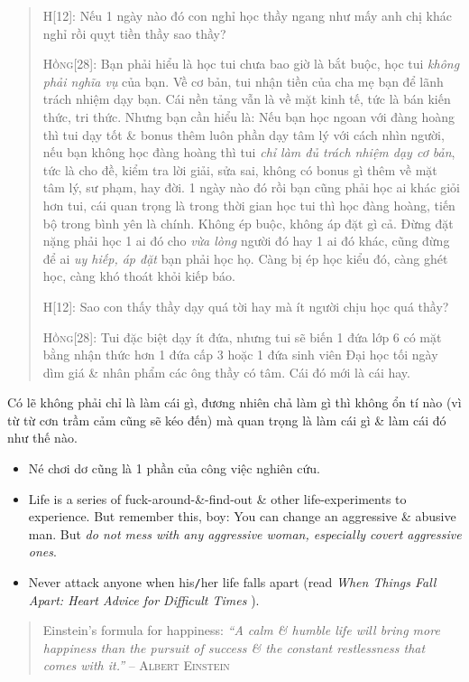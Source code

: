 \documentclass[12pt]{article}
\begin{document}
\begin{quotation}
	H[12]: Nếu 1 ngày nào đó con nghỉ học thầy ngang như mấy anh chị khác nghỉ rồi quỵt tiền thầy sao thầy?
	
	\textsc{Hồng[28]}: Bạn phải hiểu là học tui chưa bao giờ là bắt buộc, học tui {\it không phải nghĩa vụ} của bạn. Về cơ bản, tui nhận tiền của cha mẹ bạn để lãnh trách nhiệm dạy bạn. Cái nền tảng vẫn là về mặt kinh tế, tức là bán kiến thức, tri thức. Nhưng bạn cần hiểu là: Nếu bạn học ngoan với đàng hoàng thì tui dạy tốt \& bonus thêm luôn phần dạy tâm lý với cách nhìn người, nếu bạn không học đàng hoàng thì tui {\it chỉ làm đủ trách nhiệm dạy cơ bản}, tức là cho đề, kiểm tra lời giải, sửa sai, không có bonus gì thêm về mặt tâm lý, sư phạm, hay đời. 1 ngày nào đó rồi bạn cũng phải học ai khác giỏi hơn tui, cái quan trọng là trong thời gian học tui thì học đàng hoàng, tiến bộ trong bình yên là chính. Không ép buộc, không áp đặt gì cả. Đừng đặt nặng phải học 1 ai đó cho {\it vừa lòng} người đó hay 1 ai đó khác, cũng đừng để ai {\it uy hiếp, áp đặt} bạn phải học họ. Càng bị ép học kiểu đó, càng ghét học, càng khó thoát khỏi kiếp báo.
	
	H[12]: Sao con thấy thầy dạy quá tời hay mà ít người chịu học quá thầy?
	
	\textsc{Hồng[28]}: Tui đặc biệt dạy ít đứa, nhưng tui sẽ biến 1 đứa lớp 6 có mặt bằng nhận thức hơn 1 đứa cấp 3 hoặc 1 đứa sinh viên Đại học tối ngày dìm giá \& nhân phẩm các ông thầy có tâm. Cái đó mới là cái hay.
\end{quotation}

Có lẽ không phải chỉ là làm cái gì, đương nhiên chả làm gì thì không ổn tí nào (vì từ từ cơn trầm cảm cũng sẽ kéo đến) mà quan trọng là làm cái gì \& làm cái đó như thế nào.

\begin{itemize}
	\item Né chơi dơ cũng là 1 phần của công việc nghiên cứu.
	\item Life is a series of fuck-around-\&-find-out \& other life-experiments to experience. But remember this, boy: You can change an aggressive \& abusive man. But {\it do not mess with any aggressive woman, especially covert aggressive ones}. 
	\item Never attack anyone when his{\tt/}her life falls apart (read {\it When Things Fall Apart: Heart Advice for Difficult Times} \cite{Chodron2002, Chodron2021}).
\end{itemize}

\begin{quotation}
	{\sf Einstein's formula for happiness}: {\it ``A calm \& humble life will bring more happiness than the pursuit of success \& the constant restlessness that comes with it.''} -- \textsc{Albert Einstein}
\end{quotation}
\end{document}
